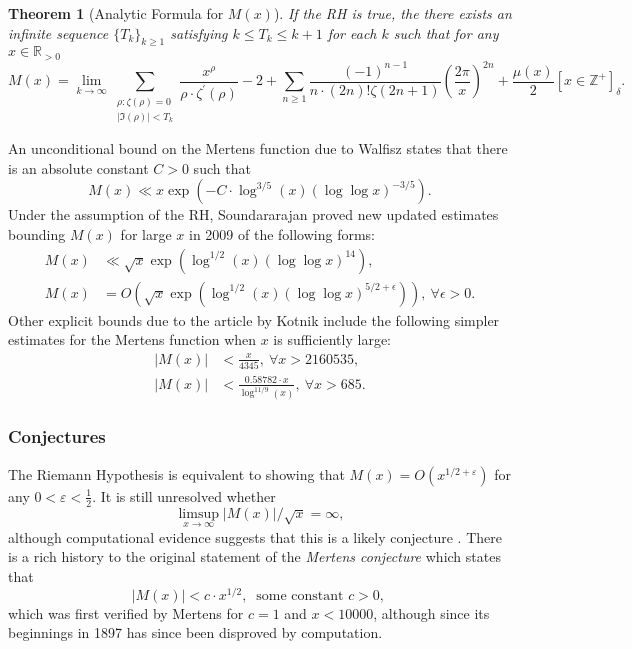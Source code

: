 \documentclass[11pt,reqno,a4letter]{article}
\numberwithin{figure}{section}
\numberwithin{table}{section}
\newcommand{\Iverson}[1]{\ensuremath{\left[#1\right]_{\delta}}}
\theoremstyle{plain}
\newtheorem{theorem}{Theorem}
\numberwithin{theorem}{section}
\theoremstyle{definition}
\begin{document}
\begin{theorem}[Analytic Formula for $M(x)$] 
\label{theorem_MxMellinTransformInvFormula} 
If the RH is true, the there exists an infinite sequence 
$\{T_k\}_{k \geq 1}$ satisfying $k \leq T_k \leq k+1$ for each $k$ 
such that for any $x \in \mathbb{R}_{>0}$ 
\[
M(x) = \lim_{k \rightarrow \infty} 
     \sum_{\substack{\rho: \zeta(\rho) = 0 \\ |\Im(\rho)| < T_k}} 
     \frac{x^{\rho}}{\rho \cdot \zeta^{\prime}(\rho)} - 2 + 
     \sum_{n \geq 1} \frac{(-1)^{n-1}}{n \cdot (2n)! \zeta(2n+1)} 
     \left(\frac{2\pi}{x}\right)^{2n} + 
     \frac{\mu(x)}{2} \Iverson{x \in \mathbb{Z}^{+}}. 
\] 
\end{theorem} 

An unconditional bound on the Mertens function due to Walfisz 
\cite{see Ivic} states that there is an absolute constant $C > 0$ such that 
$$M(x) \ll x \exp\left(-C \cdot \log^{3/5}(x) 
  (\log\log x)^{-3/5}\right).$$ 
Under the assumption of the RH, Soundararajan proved new updated estimates 
bounding $M(x)$ for large $x$ in 2009 of the following forms: 
\begin{align*} 
M(x) & \ll \sqrt{x} \exp\left(\log^{1/2}(x) (\log\log x)^{14}\right), \\ 
M(x) & = O\left(\sqrt{x} \exp\left( 
     \log^{1/2}(x) (\log\log x)^{5/2+\epsilon}\right)\right),\ 
     \forall \epsilon > 0. 
\end{align*} 
Other explicit bounds due to the article by Kotnik include the following 
simpler estimates for the Mertens function when $x$ is sufficiently 
large: 
\begin{align*} 
|M(x)| & < \frac{x}{4345},\ \forall x > 2160535, \\ 
|M(x)| & < \frac{0.58782 \cdot x}{\log^{11/9}(x)},\ \forall x > 685. 
\end{align*} 

\subsubsection{Conjectures} 

The Riemann Hypothesis is equivalent to showing that 
$M(x) = O\left(x^{1/2+\varepsilon}\right)$ for any 
$0 < \varepsilon < \frac{1}{2}$. 
It is still unresolved whether 
\[ 
\limsup_{x\rightarrow\infty} |M(x)| / \sqrt{x} = \infty, 
\] 
although computational evidence suggests that this is a likely conjecture 
\cite{ORDER-MERTENSFN,HURST-2017}. 
There is a rich history to the original statement of the \emph{Mertens conjecture} which 
states that 
\[ 
|M(x)| < c \cdot x^{1/2},\ \text{ some constant $c > 0$, }
\] 
which was first verified by Mertens for $c = 1$ and $x < 10000$, 
although since its beginnings in 1897 has since been disproved by computation. 
\end{document}
